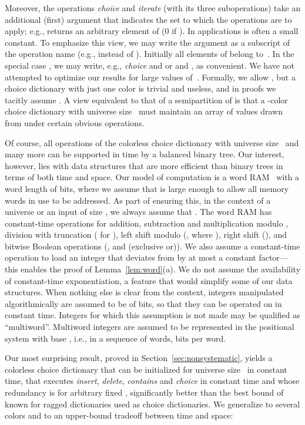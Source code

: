 \documentclass[envcountsame,envcountsect,undated,nolinenumbers]{lnthi}
\def\Tvn#1{\hbox{\textit{#1\/}}}
\begin{document}
Moreover,
the operations \Tvn{choice} and \Tvn{iterate}
(with its three suboperations) take an additional
(first) argument 
that indicates the set  to which the
operations are to apply;
e.g.,  returns an arbitrary
element of  (0 if ).
In applications  is often a small constant.
To emphasize this view, we may write the argument 
as a subscript of the operation name
(e.g., 
instead of ).
Initially all elements of  belong to~.
In the special case , we may write, e.g.,
\Tvn{choice} and  or
 and , as convenient.
We have not attempted to optimize our results
for large values of~.
Formally, we allow , but a choice dictionary
with just one color is trivial and useless,
and in proofs we tacitly assume .
A view equivalent to that of a semipartition
 of 
is that a -color choice dictionary with
universe size~ must
maintain an array of  values drawn from
 under certain
obvious operations.

Of course, all operations of the
colorless choice
dictionary with universe size~ and many more can be supported in
 time by a balanced binary tree.
Our interest, however, lies with data structures that
are more efficient than binary trees in terms of
both time and space.
Our model of computation is a word RAM~\cite{AngV79,Hag98}
with a word length of  bits, where we assume that  is
large enough to allow all memory words in use to be addressed.
As part of ensuring this, in the context of a universe or
an input of size , we always assume that
.
The word RAM has constant-time operations
for addition, subtraction and multiplication
modulo , division with truncation
( for ),
left shift modulo 
(,
where ),
right shift
(),
and bitwise Boolean operations
(,  and 
(exclusive or)).
We also assume a constant-time operation to
load an integer that deviates from 
by at most a constant factor---this enables the
proof of Lemma~\ref{lem:word}(a).
We do not assume the availability of
constant-time exponentiation,
a feature that would simplify some of
our data structures.
When nothing else is clear from the context,
integers manipulated algorithmically are assumed
to be of  bits, so that they can be
operated on in constant time.
Integers for which this assumption is not
made may be qualified as ``multiword''.
Multiword integers are assumed to be represented
in the positional system with base
, i.e., in
a sequence of words,  bits per word.

Our most surprising
result, proved in Section~\ref{sec:nonsystematic},
yields a colorless choice dictionary
that can be initialized for universe size~
in constant time,
that executes \Tvn{insert}, \Tvn{delete},
\Tvn{contains} and \Tvn{choice} in constant time
and whose redundancy is 
for arbitrary fixed ,
significantly better
than the best bound of 
known for ragged dictionaries
used as choice dictionaries.
We generalize to several colors and to
an upper-bound tradeoff between time and space:
\end{document}
